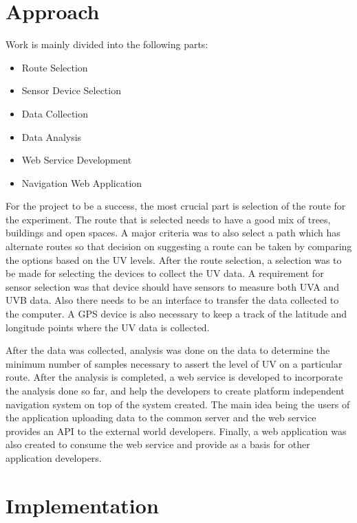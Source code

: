 \documentclass[10pt]{sigplan-proc-varsize}
\begin{document}
\section{Approach}
Work is mainly divided into the following parts:
\begin{itemize}
\item{Route Selection}
\item{Sensor Device Selection}
\item{Data Collection}
\item{Data Analysis}
\item{Web Service Development}
\item{Navigation Web Application}
\end{itemize}
For the project to be a success, the most crucial part is selection of the route for the experiment. The route that is selected needs to have a good mix of trees, buildings and open spaces. A major criteria was to also select a path which has alternate routes so that decision on suggesting a route can be taken by comparing the options based on the UV levels. After the route selection, a selection was to be made for selecting the devices to collect the UV data. A requirement for sensor selection was that device should have sensors to measure both UVA and UVB data. Also there needs to be an interface to transfer the data collected to the computer.  A GPS device is also necessary to keep a track of the latitude and longitude points where the UV data is collected.  

After the data was collected, analysis was done on the data to determine the minimum number of samples necessary to assert the level of UV on a particular route. After the analysis is completed, a web service is developed to incorporate the analysis done so far, and help the developers to create platform independent navigation system on top of the system created. The main idea being the users of the application uploading data to the common server and the web service provides an API to the external world developers. Finally, a web application was also created to consume the web service and provide as a basis for other application developers. 

\section{Implementation}
\end{document}
